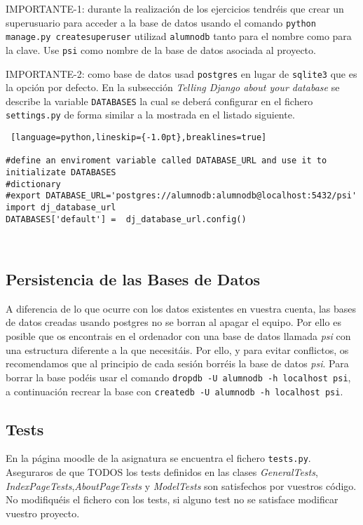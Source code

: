 \documentclass[12pt]{article} %
\begin{document}
IMPORTANTE-1: durante la realización de los ejercicios tendréis que crear un superusuario para acceder a la base de datos usando el comando \texttt{python manage.py createsuperuser} utilizad \texttt{alumnodb} tanto para el nombre como para la clave. Use \texttt{psi} como nombre de la base de datos asociada al proyecto.

IMPORTANTE-2: como base de datos usad \texttt{postgres} en lugar de \texttt{sqlite3} que es
la opción por defecto. En la subsección \textit{Telling Django about your database} se describe 
la variable \texttt{DATABASES} la cual se deberá configurar en el fichero \texttt{settings.py} de forma similar a la mostrada en el listado siguiente.\\

\begin{lstlisting} [language=python,lineskip={-1.0pt},breaklines=true] 

#define an enviroment variable called DATABASE_URL and use it to initializate DATABASES
#dictionary
#export DATABASE_URL='postgres://alumnodb:alumnodb@localhost:5432/psi'
import dj_database_url
DATABASES['default'] =  dj_database_url.config()

   
\end{lstlisting}
\subsection{Persistencia de las Bases de Datos}
A diferencia de lo que ocurre con los datos existentes en vuestra cuenta, las bases de datos creadas usando postgres no se borran al apagar el equipo. Por ello es posible que os encontrais en el ordenador con una base de datos llamada \textit{psi} con una estructura diferente a la que necesitáis. Por ello, y para evitar conflictos, os recomendamos que al principio de cada sesión borréis la base de datos \textit{psi}. Para borrar la base podéis usar el comando \texttt{dropdb -U alumnodb -h localhost psi}, a continuación recrear la base con \texttt{createdb -U alumnodb -h localhost psi}.

\subsection{Tests}
En la página moodle de la asignatura se encuentra el fichero \texttt{tests.py}. Aseguraros de que TODOS los tests definidos en las clases \textit{GeneralTests}, \textit{IndexPageTests},\textit{AboutPageTests} y \textit{ModelTests} son satisfechos por vuestros código. No modifiquéis el fichero con los tests, si alguno test no se satisface modificar vuestro proyecto. 
\end{document}
